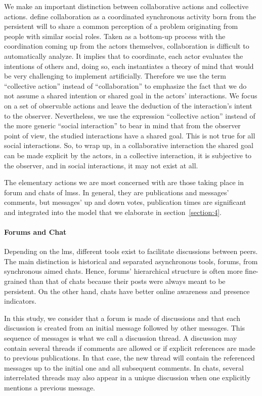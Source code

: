 \documentclass[a4paper,twoside]{article}
\begin{document}
We make an important distinction between collaborative actions and collective actions.  \cite{Dillenbourg1999} define collaboration as a coordinated synchronous activity born from the persistent will to share a common perception of a problem originating from people with similar social roles.  Taken as a bottom-up process with the coordination coming up from the actors themselves, collaboration is difficult to automatically analyze.  It implies that to coordinate, each actor evaluates the intentions of others and, doing so, each instantiates a theory of mind \citep{Gerstenberg2017} that would be very challenging to implement artificially.  Therefore we use the term ``collective action'' instead of ``collaboration'' to emphasize the fact that we do not assume a shared intention or shared goal in the actors' interactions.  We focus on a set of observable actions and leave the deduction of the interaction's intent to the observer.  Nevertheless,  we use the expression ``collective action'' instead of the more generic ``social interaction'' to bear in mind that from the observer point of view, the studied interactions have a shared goal.  This is not true for all social interactions.  So, to wrap up, in a collaborative interaction the shared goal can be made explicit by the actors, in a collective interaction, it is subjective to the observer, and in social interactions, it may not exist at all.

The elementary actions we are most concerned with are those taking place in forum and chats of \glspl{lms}.  In general, they are publications and messages' comments, but messages' up and down votes, publication times are significant and integrated into the model that we elaborate in section~\ref{section:4}.

\paragraph{Forums and Chat}

Depending on the \gls{lms}, different tools exist to facilitate discussions between peers.  The main distinction is historical and separated asynchronous tools, forums, from synchronous aimed chats.  Hence, forums' hierarchical structure is often more fine-grained than that of chats because their posts were always meant to be persistent.  On the other hand, chats have better online awareness and presence indicators.

In this study, we consider that a forum is made of discussions and that each discussion is created from an initial message followed by other messages.  This sequence of messages is what we call a discussion thread.  A discussion may contain several threads if comments are allowed or if explicit references are made to previous publications.   In that case, the new thread will contain the referenced messages up to the initial one and all subsequent comments.  In chats, several interrelated threads may also appear in a unique discussion when one explicitly mentions a previous message.
\end{document}
